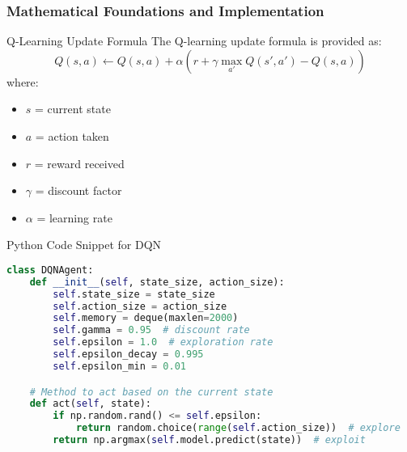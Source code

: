 \documentclass[aspectratio=169]{beamer}
\begin{document}
\begin{frame}[fragile]
    \frametitle{Mathematical Foundations and Implementation}

    \begin{block}{Q-Learning Update Formula}
        The Q-learning update formula is provided as:
        \begin{equation}
            Q(s, a) \leftarrow Q(s, a) + \alpha \left( r + \gamma \max_{a'} Q(s', a') - Q(s, a) \right)
        \end{equation}
        where:
        \begin{itemize}
            \item \( s \) = current state
            \item \( a \) = action taken
            \item \( r \) = reward received
            \item \( \gamma \) = discount factor
            \item \( \alpha \) = learning rate
        \end{itemize}
    \end{block}

    \begin{block}{Python Code Snippet for DQN}
        \begin{lstlisting}[language=Python]
class DQNAgent:
    def __init__(self, state_size, action_size):
        self.state_size = state_size
        self.action_size = action_size
        self.memory = deque(maxlen=2000)
        self.gamma = 0.95  # discount rate
        self.epsilon = 1.0  # exploration rate
        self.epsilon_decay = 0.995
        self.epsilon_min = 0.01

    # Method to act based on the current state
    def act(self, state):
        if np.random.rand() <= self.epsilon:
            return random.choice(range(self.action_size))  # explore
        return np.argmax(self.model.predict(state))  # exploit
        \end{lstlisting}
    \end{block}
\end{frame}
\end{document}
